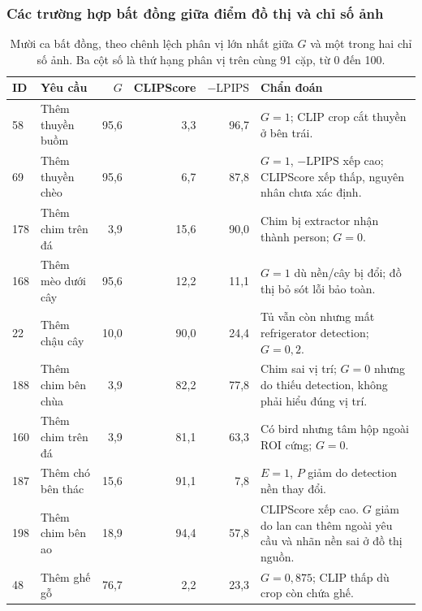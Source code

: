 \subsubsection{Các trường hợp bất đồng giữa điểm đồ thị và chỉ số ảnh}\leavevmode\par\nobreak
\begin{table}[H]\centering\small
\caption{Mười ca bất đồng, theo chênh lệch phân vị lớn nhất giữa $G$ và một trong hai chỉ số ảnh. Ba cột số là thứ hạng phân vị trên cùng 91 cặp, từ 0 đến 100.}\label{tab:cases3}
\begin{tabularx}{\linewidth}{@{}l l r r r X@{}}\toprule
ID & Yêu cầu & $G$ & CLIPScore & $-\mathrm{LPIPS}$ & Chẩn đoán\\\midrule
58 & Thêm thuyền buồm & 95,6 & 3,3 & 96,7 & $G=1$; CLIP crop cắt thuyền ở bên trái.\\
69 & Thêm thuyền chèo & 95,6 & 6,7 & 87,8 & $G=1$, $-\mathrm{LPIPS}$ xếp cao; CLIPScore xếp thấp, nguyên nhân chưa xác định.\\
178 & Thêm chim trên đá & 3,9 & 15,6 & 90,0 & Chim bị extractor nhận thành person; $G=0$.\\
168 & Thêm mèo dưới cây & 95,6 & 12,2 & 11,1 & $G=1$ dù nền/cây bị đổi; đồ thị bỏ sót lỗi bảo toàn.\\
22 & Thêm chậu cây & 10,0 & 90,0 & 24,4 & Tủ vẫn còn nhưng mất refrigerator detection; $G=0,2$.\\
188 & Thêm chim bên chùa & 3,9 & 82,2 & 77,8 & Chim sai vị trí; $G=0$ nhưng do thiếu detection, không phải hiểu đúng vị trí.\\
160 & Thêm chim trên đá & 3,9 & 81,1 & 63,3 & Có bird nhưng tâm hộp ngoài ROI cứng; $G=0$.\\
187 & Thêm chó bên thác & 15,6 & 91,1 & 7,8 & $E=1$, $P$ giảm do detection nền thay đổi.\\
198 & Thêm chim bên ao & 18,9 & 94,4 & 57,8 & CLIPScore xếp cao. $G$ giảm do lan can thêm ngoài yêu cầu và nhãn nền sai ở đồ thị nguồn.\\
48 & Thêm ghế gỗ & 76,7 & 2,2 & 23,3 & $G=0,875$; CLIP thấp dù crop còn chứa ghế.\\
\bottomrule\end{tabularx}\end{table}

